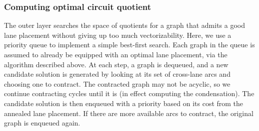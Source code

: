 \subsubsection*{Computing optimal circuit quotient}


The outer layer searches the space of quotients for a graph that admits a good lane placement without giving up too much vectorizability.
Here, we use a priority queue to implement a simple best-first search.
Each graph in the queue is assumed to already be equipped with an optimal lane placement, via the algorithm described above.
At each step, a graph is dequeued, and a new candidate solution is generated by looking at its set of cross-lane arcs and choosing one to contract.
The contracted graph may not be acyclic, so we continue contracting cycles until it is (in effect computing the condensation). %
The candidate solution is then enqueued with a priority based on its cost from the annealed lane placement.
If there are more available arcs to contract, the original graph is enqueued again.

